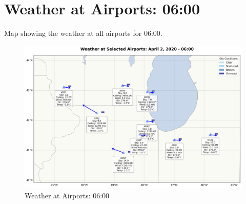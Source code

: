 \section{Weather at Airports: 06:00}
Map showing the weather at all airports for 06:00.
\begin{figure}[htbp]
\centering
\includegraphics[width=0.7	extwidth]{weather_map_06_00.png}
\caption{Weather at Airports: 06:00}
\label{fig:weather_map_06_00}
\end{figure}

